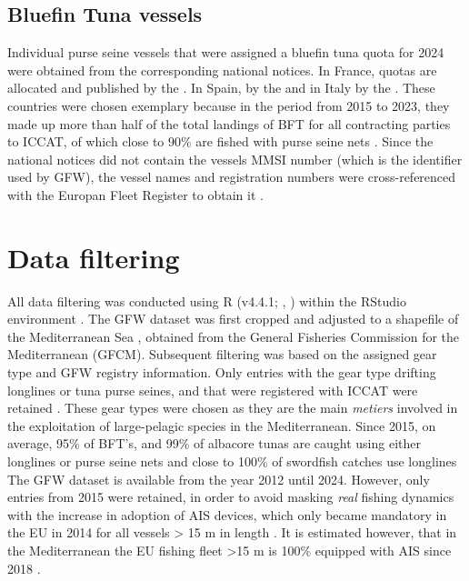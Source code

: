 \subsection{Bluefin Tuna vessels}
Individual purse seine vessels that were assigned a bluefin tuna quota for 2024 were obtained from
the corresponding national notices. In France, quotas are allocated and published by the
\cite{registry_france}. In Spain, by the \cite{registry_spain} and in Italy by the
\cite{registry_italy}. These countries were chosen exemplary because in the period from 2015 to
2023, they made up more than half of the total landings of BFT for all contracting parties to
ICCAT, of which close to 90\% are fished with purse seine nets \citep{iccat_bft_summary}. Since the
national notices did not contain the vessels MMSI number (which is the identifier used by GFW), the
vessel names and registration numbers were cross-referenced with the Europan Fleet Register to
obtain it \citep{eu_fleet_register}.

\section{Data filtering}
All data filtering was conducted using R (v4.4.1; \citeauthor{r_language}, \citeyear{r_language})
within the RStudio environment \citep{rstudio}. The GFW dataset was first cropped and adjusted to a
shapefile of the Mediterranean Sea , obtained from the General Fisheries
Commission for the Mediterranean (GFCM). Subsequent filtering was based on the assigned gear type
and GFW registry information. Only entries with the gear type drifting longlines or tuna purse
seines, and that were registered with ICCAT were retained . These gear types
were chosen as they are the main \textit{metiers} involved in the exploitation of large-pelagic
species in the Mediterranean. Since 2015, on average, 95\% of BFT's, and 99\% of albacore tunas are
caught using either longlines or purse seine nets and close to 100\% of swordfish catches use
longlines \citep{iccat_bft_summary,iccat_alb_summary,iccat_swo_summary} The GFW dataset is
available from the year 2012 until 2024. However, only entries from 2015 were retained, in order to
avoid masking \textit{real} fishing dynamics with the increase in adoption of AIS devices, which
only became mandatory in the EU in 2014 for all vessels > 15 m in length \citep{ec2011directive}.
It is estimated however, that in the Mediterranean the EU fishing fleet >15 m is 100\% equipped
with AIS since 2018 \citep{taconet2019global}.

